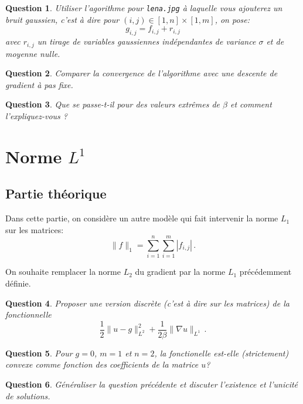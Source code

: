 \documentclass[10pt,a4paper,fleqn]{report}
\newtheorem{question}{Question}
\begin{document}
\begin{question}
Utiliser l'agorithme pour \texttt{lena.jpg} \`a laquelle vous ajouterez un bruit gaussien, c'est \`a dire pour $ (i,j)\in [1,n]\times[1,m]$, on pose:
\begin{equation}
g_{i,j} = f_{i,j} + r_{i,j}
\end{equation}
avec $r_{i,j}$ un tirage de variables gaussiennes ind\'ependantes de variance $\sigma$ et de moyenne nulle.
\end{question}

\begin{question}
Comparer la convergence de l'algorithme avec une descente de gradient \`a pas fixe.
\end{question}

\begin{question}
Que se passe-t-il pour des valeurs extrêmes de $\beta$ et comment l'expliquez-vous ?
\end{question}


\section{Norme $L^{1}$}
\subsection{Partie théorique}
Dans cette partie, on consid\`ere un autre mod\`ele qui fait intervenir la norme $L_1$ sur les matrices:
\begin{equation}
\| f \|_{1} = \sum_{i=1}^n \sum_{i=1}^m |f_{i,j}| \,.
\end{equation}

On souhaite remplacer la norme $L_2$ du gradient par la norme $L_1$ pr\'ec\'edemment d\'efinie.

\begin{question}
Proposer une version discr\`ete (c'est \`a dire sur les matrices) de la fonctionnelle $$ \frac12 \| u -  g\|^2_{L^2} + \frac{1}{2\beta}\| \nabla u \|_{L^1}\,.$$
\end{question}

\begin{question}
Pour $g=0$, $m=1$ et $n=2$, la fonctionelle est-elle (strictement) convexe comme fonction des coefficients de la matrice $u$?
\end{question}

\begin{question}
G\'en\'eraliser la question pr\'ec\'edente et discuter l'existence et l'unicit\'e de solutions.
\end{question}
\end{document}
